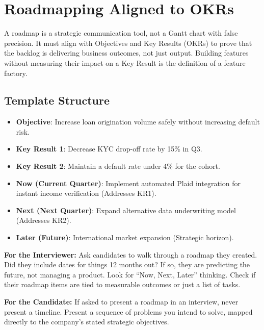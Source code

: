 \documentclass[
  11pt,
  openany,
  oneside]{book}
\providecommand{\tightlist}{%
  \setlength{\itemsep}{0pt}\setlength{\parskip}{0pt}}
\renewenvironment{quote}{\begin{customquote}}{\end{customquote}}
\begin{document}
\section{Roadmapping Aligned to OKRs}\label{roadmapping-aligned-to-okrs}

A roadmap is a strategic communication tool, not a Gantt chart with
false precision. It must align with Objectives and Key Results (OKRs) to
prove that the backlog is delivering business outcomes, not just output.
Building features without measuring their impact on a Key Result is the
definition of a feature factory.

\subsection{Template Structure}\label{template-structure}

\begin{itemize}
\tightlist
\item
  \textbf{Objective}: Increase loan origination volume safely without
  increasing default risk.
\item
  \textbf{Key Result 1}: Decrease KYC drop-off rate by 15\% in Q3.
\item
  \textbf{Key Result 2}: Maintain a default rate under 4\% for the
  cohort.
\item
  \textbf{Now (Current Quarter)}: Implement automated Plaid integration
  for instant income verification (Addresses KR1).
\item
  \textbf{Next (Next Quarter)}: Expand alternative data underwriting
  model (Addresses KR2).
\item
  \textbf{Later (Future)}: International market expansion (Strategic
  horizon).
\end{itemize}

\begin{quote}
\textbf{For the Interviewer:} Ask candidates to walk through a roadmap
they created. Did they include dates for things 12 months out? If so,
they are predicting the future, not managing a product. Look for ``Now,
Next, Later'' thinking. Check if their roadmap items are tied to
measurable outcomes or just a list of tasks.
\end{quote}

\begin{quote}
\textbf{For the Candidate:} If asked to present a roadmap in an
interview, never present a timeline. Present a sequence of problems you
intend to solve, mapped directly to the company's stated strategic
objectives.
\end{quote}
\end{document}
